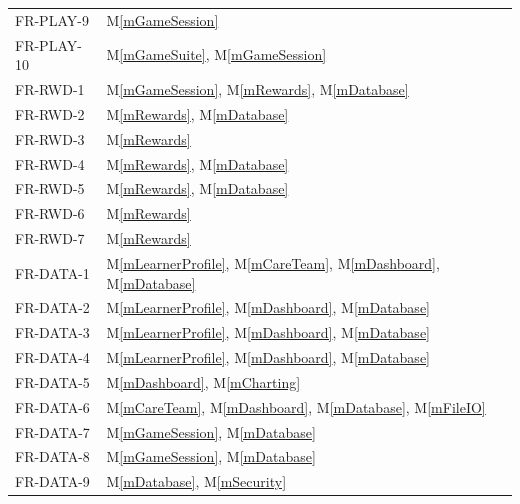 \documentclass[12pt, titlepage]{article}
\newcommand{\mref}[1]{M\ref{#1}}
\begin{document}
\begin{longtable}{p{} p{}}
FR-PLAY-9 & \mref{mGameSession}\\
FR-PLAY-10 & \mref{mGameSuite}, \mref{mGameSession}\\
FR-RWD-1 & \mref{mGameSession}, \mref{mRewards}, \mref{mDatabase}\\
FR-RWD-2 & \mref{mRewards}, \mref{mDatabase}\\
FR-RWD-3 & \mref{mRewards}\\
FR-RWD-4 & \mref{mRewards}, \mref{mDatabase}\\
FR-RWD-5 & \mref{mRewards}, \mref{mDatabase}\\
FR-RWD-6 & \mref{mRewards}\\
FR-RWD-7 & \mref{mRewards}\\
FR-DATA-1 & \mref{mLearnerProfile}, \mref{mCareTeam}, \mref{mDashboard}, \mref{mDatabase}\\
FR-DATA-2 & \mref{mLearnerProfile}, \mref{mDashboard}, \mref{mDatabase}\\
FR-DATA-3 & \mref{mLearnerProfile}, \mref{mDashboard}, \mref{mDatabase}\\
FR-DATA-4 & \mref{mLearnerProfile}, \mref{mDashboard}, \mref{mDatabase}\\
FR-DATA-5 & \mref{mDashboard}, \mref{mCharting}\\
FR-DATA-6 & \mref{mCareTeam}, \mref{mDashboard}, \mref{mDatabase}, \mref{mFileIO}\\
FR-DATA-7 & \mref{mGameSession}, \mref{mDatabase}\\
FR-DATA-8 & \mref{mGameSession}, \mref{mDatabase}\\
FR-DATA-9 & \mref{mDatabase}, \mref{mSecurity}\\
\bottomrule
\end{longtable}
\end{document}
